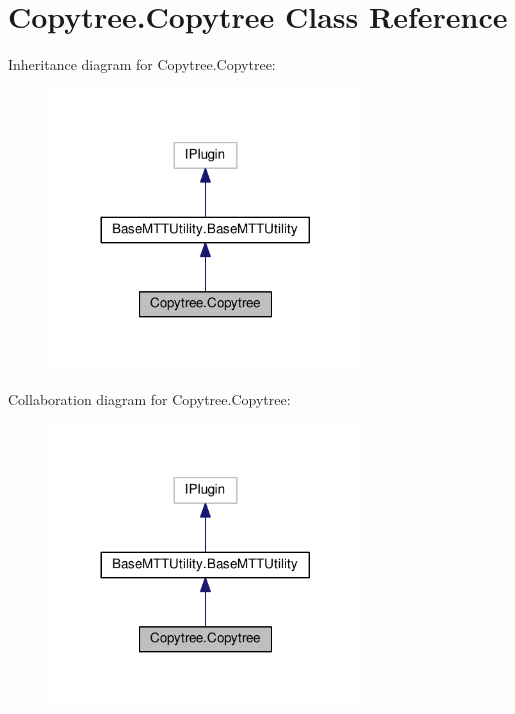 \hypertarget{classCopytree_1_1Copytree}{\section{Copytree.\-Copytree Class Reference}
\label{classCopytree_1_1Copytree}
}


Inheritance diagram for Copytree.\-Copytree\-:
\nopagebreak
\begin{figure}[H]
\begin{center}
\leavevmode
\includegraphics[width=236pt]{classCopytree_1_1Copytree__inherit__graph}
\end{center}
\end{figure}


Collaboration diagram for Copytree.\-Copytree\-:
\nopagebreak
\begin{figure}[H]
\begin{center}
\leavevmode
\includegraphics[width=236pt]{classCopytree_1_1Copytree__coll__graph}
\end{center}
\end{figure}
